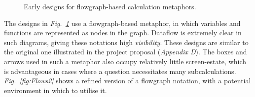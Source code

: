 \documentclass[12pt,twoside,notitlepage,xetex]{report}
\begin{document}
\begin{center}
\begin{figure}[H]
\begin{center}
\end{center}
\caption{Early designs for flowgraph-based calculation metaphors.}
\label{fig:Flows1}
\end{figure}
\end{center}

The designs in \emph{Fig.~\ref{fig:Flows1}} use a flowgraph-based metaphor, in which variables and functions are represented as nodes in the graph.  Dataflow is extremely clear in such diagrams, giving these notations high \emph{visibility}.  These designs are similar to the original one illustrated in the project proposal (\emph{Appendix D}).  The boxes and arrows used in such a metaphor also occupy relatively little screen-estate, which is advantageous in cases where a question necessitates many subcalculations.  \emph{Fig.~\ref{fig:Flows2}} shows a refined version of a flowgraph notation, with a potential environment in which to utilise it.
\end{document}
